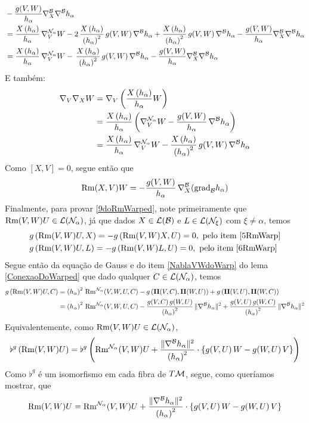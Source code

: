 \begin{demm}
\begin{align*}
&- \frac{g(V, W)}{h_{\alpha}} \nabla^{\mathcal{B}}_X \nabla^{\mathcal{B}} h_{\alpha} \\
&=  \frac{X\left(  h_{\alpha} \right)}{h_{\alpha}} \, \nabla^{\mathcal{N}_{\alpha}}_{V} W - 2 \, \frac{X\left(  h_{\alpha} \right)}{\left( h_{\alpha} \right)^2} \, g(V, W) \, \nabla^{\mathcal{B}} h_{\alpha} + \frac{X\left(  h_{\alpha} \right)}{\left( h_{\alpha} \right)^2} \, g(V, W) \, \nabla^{\mathcal{B}} h_{\alpha} - \frac{g(V, W)}{h_{\alpha}} \nabla^{\mathcal{B}}_X \nabla^{\mathcal{B}} h_{\alpha} \\
&=  \frac{X\left(  h_{\alpha} \right)}{h_{\alpha}} \, \nabla^{\mathcal{N}_{\alpha}}_{V} W -  \, \frac{X\left(  h_{\alpha} \right)}{\left( h_{\alpha} \right)^2} \, g(V, W) \, \nabla^{\mathcal{B}} h_{\alpha} - \frac{g(V, W)}{h_{\alpha}} \nabla^{\mathcal{B}}_X \nabla^{\mathcal{B}} h_{\alpha}
\end{align*}
E também:
\begin{align*}
\nabla_V \nabla_X W &= \nabla_V \left( \frac{X \left( h_{\alpha} \right) }{h_{\alpha}} W  \right) \\
&=\frac{X \left( h_{\alpha} \right) }{h_{\alpha}} \left(  \nabla^{\mathcal{N}_{\alpha}}_V W - \frac{g(V, W)}{h_{\alpha}} \, \nabla^{\mathcal{B}} h_{\alpha}   \right) \\
&= \frac{X \left( h_{\alpha} \right) }{h_{\alpha}}  \, \nabla^{\mathcal{N}_{\alpha}}_V W  - \frac{X\left(  h_{\alpha} \right)}{\left( h_{\alpha} \right)^2} \, g(V, W) \, \nabla^{\mathcal{B}} h_{\alpha}
\end{align*}
Como $[X, V] = 0$, segue então que
\[
\mathrm{Rm}(X, V)W = -\frac{g(V, W)}{h_{\alpha}} \, \nabla^{\mathcal{B}}_X(\text{grad}_{\mathcal{B}} h_{\alpha})
\]
Finalmente, para provar \ref{9doRmWarped}, note primeiramente que $\mathrm{Rm}(V, W)U \in \mathcal{L}(\mathcal{N}_{\alpha})$, já que dados $X \in \mathcal{L}(\mathcal{B})$ e $L \in \mathcal{L}(\mathcal{N}_{\xi})$ com $\xi \neq \alpha$, temos
\begin{align*}
&g\left( \mathrm{Rm}(V, W)U, X  \right) = -g\left( \mathrm{Rm}(V, W)X, U  \right) = 0 , \text{ pelo item \ref{5RmWarp}}\\
&g\left( \mathrm{Rm}(V, W)U, L  \right) = -g\left( \mathrm{Rm}(V, W)L, U  \right) = 0, \text{  pelo item \ref{6RmWarp}}
\end{align*}
Segue então da equação de Gauss e do item \ref{NablaVWdoWarp} do lema \cref{ConexaoDoWarped} que dado qualquer $C \in \mathcal{L}(\mathcal{N}_{\alpha})$, temos
\begin{align*}
g\parent{\Rm(V, W)U, C } &= \parent{h_{\alpha}}^2 \, \Rm^{\nn_{\alpha}}(V, W, U, C) - g\parent{ \segf(V, C), \segf(W, U) } + g\parent{ \segf(V, U), \segf(W, C) } \\
&= \parent{h_{\alpha}}^2 \, \Rm^{\nn_{\alpha}}(V, W, U, C) - \frac{g(V, C) \, g(W, U)}{\parent{h_{\alpha}}^2} \, \| \cn^{\bb} h_{\alpha} \|^2 + \frac{g(V, U) \, g(W, C)}{\parent{h_{\alpha}}^2} \, \| \cn^{\bb} h_{\alpha} \|^2  
\end{align*}
Equivalentemente, como $\mathrm{Rm}(V, W)U \in \mathcal{L}(\mathcal{N}_{\alpha})$, 
\[
\flat^{g} \left( \mathrm{Rm}(V, W)U  \right) = \flat^{g} \left(  \mathrm{Rm}^{\mathcal{N}_{\alpha}}(V, W) U + \frac{\| \nabla^{\mathcal{B}} h_{\alpha} \|^2}{\left( h_{\alpha} \right)^2} \cdot \left\{ g(V, U) \, W - g(W, U) \, V \right\}  \right) 
\]
Como $\flat^{g}$ é um isomorfismo em cada fibra de $T \mathcal{M}$, segue, como queríamos mostrar, que
\[
\mathrm{Rm}(V, W)U = \mathrm{Rm}^{\mathcal{N}_{\alpha}}(V, W) U + \frac{\| \nabla^{\mathcal{B}} h_{\alpha} \|^2}{\left( h_{\alpha} \right)^2} \cdot \left\{ g(V, U) \, W - g(W, U) \, V \right\} 
\]
\end{demm}

